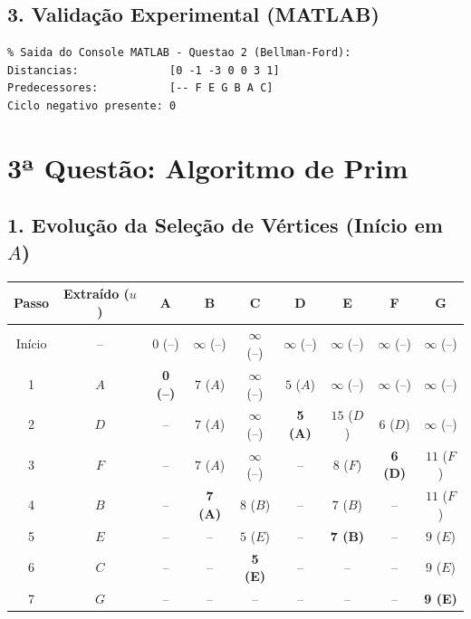 \documentclass[11pt, a4paper]{article}
\begin{document}
\subsection*{3. Validação Experimental (MATLAB)}
\begin{lstlisting}
% Saida do Console MATLAB - Questao 2 (Bellman-Ford):
Distancias:              [0 -1 -3 0 0 3 1]
Predecessores:           [-- F E G B A C]
Ciclo negativo presente: 0
\end{lstlisting}

\vspace{0.2cm}

\section*{3ª Questão: Algoritmo de Prim}

\subsection*{1. Evolução da Seleção de Vértices (Início em $A$)}

\begin{center}
\begin{tabular}{ccccccccc}
\toprule
\textbf{Passo} & \textbf{Extraído ($u$)} & \textbf{A} & \textbf{B} & \textbf{C} & \textbf{D} & \textbf{E} & \textbf{F} & \textbf{G} \\
\midrule
Início & -- & $0$ (--) & $\infty$ (--) & $\infty$ (--) & $\infty$ (--) & $\infty$ (--) & $\infty$ (--) & $\infty$ (--) \\
1 & $A$ & \textbf{0 (--)} & $7$ ($A$) & $\infty$ (--) & $5$ ($A$) & $\infty$ (--) & $\infty$ (--) & $\infty$ (--) \\
2 & $D$ & -- & $7$ ($A$) & $\infty$ (--) & \textbf{5 (A)} & $15$ ($D$) & $6$ ($D$) & $\infty$ (--) \\
3 & $F$ & -- & $7$ ($A$) & $\infty$ (--) & -- & $8$ ($F$) & \textbf{6 (D)} & $11$ ($F$) \\
4 & $B$ & -- & \textbf{7 (A)} & $8$ ($B$) & -- & $7$ ($B$) & -- & $11$ ($F$) \\
5 & $E$ & -- & -- & $5$ ($E$) & -- & \textbf{7 (B)} & -- & $9$ ($E$) \\
6 & $C$ & -- & -- & \textbf{5 (E)} & -- & -- & -- & $9$ ($E$) \\
7 & $G$ & -- & -- & -- & -- & -- & -- & \textbf{9 (E)} \\
\bottomrule
\end{tabular}
\end{center}
\end{document}
